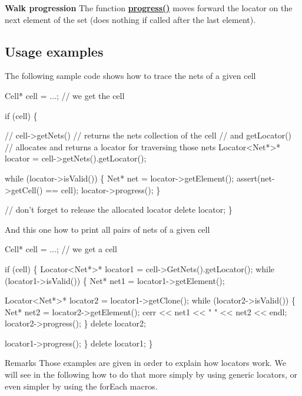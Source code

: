 {\bfseries Walk progression} The function {\bfseries \mbox{\hyperlink{classHurricane_1_1Locator_ad8d72c1625a343a50520792c96fa1ca1}{progress()}}} moves forward the locator on the next element of the set (does nothing if called after the last element).\hypertarget{classHurricane_1_1Locator_secLocatorUsageExamples}{}\subsection{Usage examples}\label{classHurricane_1_1Locator_secLocatorUsageExamples}
The following sample code shows how to trace the nets of a given cell 
\begin{DoxyCode}
Cell* cell = ...; \textcolor{comment}{// we get the cell}
 
\textcolor{keywordflow}{if} (cell) \{
 
   \textcolor{comment}{// cell->getNets()}
   \textcolor{comment}{//    returns the nets collection of the cell}
   \textcolor{comment}{// and getLocator()}
   \textcolor{comment}{//    allocates and returns a locator for traversing those nets}
   Locator<Net*>* locator = cell->getNets().getLocator();
 
   \textcolor{keywordflow}{while} (locator->isValid()) \{
      Net* net = locator->getElement();
      assert(net->getCell() == cell);
      locator->progress();
   \}
 
   \textcolor{comment}{// don't forget to release the allocated locator}
   \textcolor{keyword}{delete} locator;
\}
\end{DoxyCode}
 And this one how to print all pairs of nets of a given cell 
\begin{DoxyCode}
Cell* cell = ...; \textcolor{comment}{// we get a cell}
 
\textcolor{keywordflow}{if} (cell) \{
   Locator<Net*>* locator1 = cell->GetNets().getLocator();
   \textcolor{keywordflow}{while} (locator1->isValid()) \{
      Net* net1 = locator1->getElement();
 
      Locator<Net*>* locator2 = locator1->getClone();
      \textcolor{keywordflow}{while} (locator2->isValid()) \{
         Net* net2 = locator2->getElement();
         cerr << net1 << \textcolor{stringliteral}{" "} << net2 << endl;
         locator2->progress();
      \}
      \textcolor{keyword}{delete} locator2;
 
      locator1->progress();
   \}
   \textcolor{keyword}{delete} locator1;
\}
\end{DoxyCode}
 \begin{DoxyRemark}{Remarks}
Those examples are given in order to explain how locators work. We will see in the following how to do that more simply by using generic locators, or even simpler by using the for\+Each macros. 
\end{DoxyRemark}


